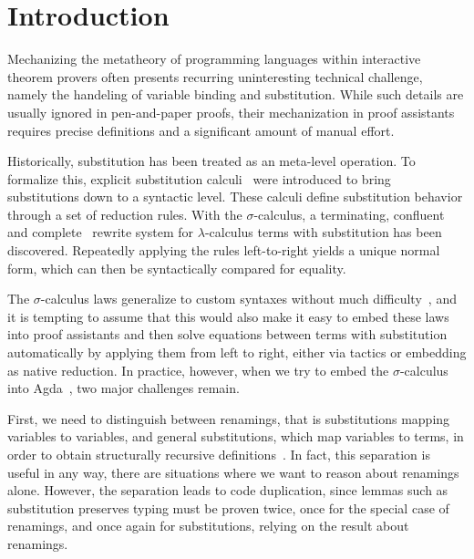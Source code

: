 \documentclass[screen,nonacm]{acmart}
\begin{document}
\maketitle

\section{Introduction}\label{sec:introduction}

Mechanizing the metatheory of programming languages within interactive theorem
provers often presents recurring uninteresting technical challenge, namely the
handeling of variable binding and substitution. While such details are usually
ignored in pen-and-paper proofs, their mechanization in proof assistants
requires precise definitions and a significant amount of manual effort.

Historically, substitution has been treated as an meta-level operation. To
formalize this, explicit substitution calculi~\cite{10.1145/96709.96712} were
introduced to bring substitutions down to a syntactic level. These calculi
define substitution behavior through a set of reduction rules. With the
$σ$-calculus, a terminating, confluent~\cite{10.1145/226643.226675} and
complete~\cite{10.1145/2676724.2693163} rewrite system for $λ$-calculus terms
with substitution has been discovered. Repeatedly applying the rules
left-to-right yields a unique normal form, which can then be syntactically
compared for equality.

The $σ$-calculus laws generalize to custom syntaxes without much
difficulty~\cite{schafer2015autosubst}, and it is tempting to assume that this
would also make it easy to embed these laws into proof assistants and then
solve equations between terms with substitution automatically by applying them
from left to right, either via tactics or embedding as native reduction. In
practice, however, when we try to embed the $\sigma$-calculus into
Agda~\cite{norellPracticalProgrammingLanguage2007}, two major challenges
remain.

First, we need to distinguish between renamings, that is substitutions mapping
variables to variables, and general substitutions, which map variables to
terms, in order to obtain structurally recursive
definitions~\cite{10.1007/11617990_1}. In fact, this separation is useful in
any way, there are situations where we want to reason about renamings alone.
However, the separation leads to code duplication, since lemmas such as
substitution preserves typing must be proven twice, once for the special case
of renamings, and once again for substitutions, relying on the result about
renamings.
\end{document}
